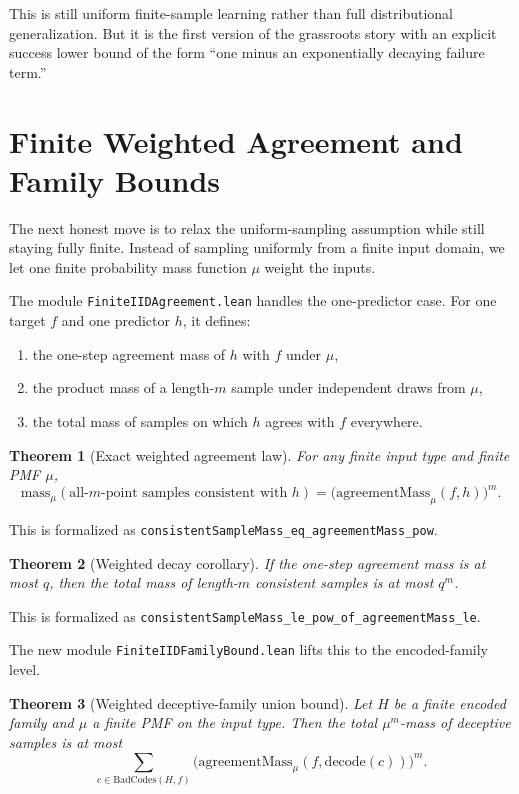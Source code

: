 \documentclass[11pt]{article}
\newtheorem{theorem}{Theorem}[section]
\theoremstyle{remark}
\begin{document}
This is still uniform finite-sample learning rather than full distributional
generalization.  But it is the first version of the grassroots story with an
explicit success lower bound of the form ``one minus an exponentially decaying
failure term.''

\section{Finite Weighted Agreement and Family Bounds}

The next honest move is to relax the uniform-sampling assumption while still
staying fully finite.  Instead of sampling uniformly from a finite input domain,
we let one finite probability mass function \(\mu\) weight the inputs.

The module \texttt{FiniteIIDAgreement.lean} handles the one-predictor case.  For
one target \(f\) and one predictor \(h\), it defines:
\begin{enumerate}[leftmargin=1.5em]
  \item the one-step agreement mass of \(h\) with \(f\) under \(\mu\),
  \item the product mass of a length-\(m\) sample under independent draws from \(\mu\),
  \item the total mass of samples on which \(h\) agrees with \(f\) everywhere.
\end{enumerate}

\begin{theorem}[Exact weighted agreement law]
For any finite input type and finite PMF \(\mu\),
\[
  \mathrm{mass}_{\mu}(\text{all-$m$-point samples consistent with } h)
  =
  \bigl(\mathrm{agreementMass}_{\mu}(f,h)\bigr)^m.
\]
\end{theorem}

\noindent
This is formalized as
\texttt{consistentSampleMass\_eq\_agreementMass\_pow}.

\begin{theorem}[Weighted decay corollary]
If the one-step agreement mass is at most \(q\), then the total mass of
length-\(m\) consistent samples is at most \(q^m\).
\end{theorem}

\noindent
This is formalized as
\texttt{consistentSampleMass\_le\_pow\_of\_agreementMass\_le}.

The new module \texttt{FiniteIIDFamilyBound.lean} lifts this to the encoded-family
level.

\begin{theorem}[Weighted deceptive-family union bound]
Let \(H\) be a finite encoded family and \(\mu\) a finite PMF on the input type.
Then the total \(\mu^m\)-mass of deceptive samples is at most
\[
  \sum_{c \in \mathrm{BadCodes}(H,f)}
    \bigl(\mathrm{agreementMass}_{\mu}(f,\mathrm{decode}(c))\bigr)^m.
\]
\end{theorem}
\end{document}
